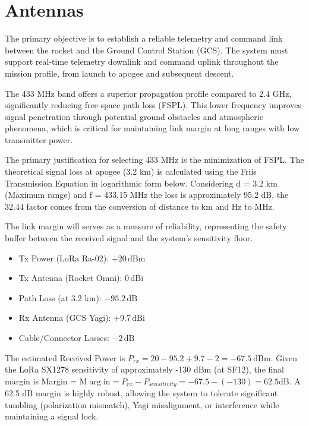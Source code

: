 \section{Antennas}

The primary objective is to establish a reliable telemetry and command link between the rocket and the Ground Control Station (GCS). The system must support real-time telemetry downlink and command uplink throughout the mission profile, from launch to apogee and subsequent descent.  

The 433 MHz band offers a superior propagation profile compared to 2.4 GHz, significantly reducing free-space path loss (FSPL). This lower frequency improves signal penetration through potential ground obstacles and atmospheric phenomena, which is critical for maintaining link margin at long ranges with low transmitter power. 

The primary justification for selecting 433 MHz is the minimization of FSPL. The theoretical signal loss at apogee (3.2 km) is calculated using the Friis Transmission Equation in logarithmic form below. Considering d = 3.2 km (Maximum range) and f = 433.15 MHz the loss is approximately 95.2 dB, the 32.44 factor comes from the conversion of distance to km and Hz to MHz. 

The link margin will serves as a measure of reliability, representing the safety buffer between the received signal and the system's sensitivity floor. 

\begin{itemize}
    \item Tx Power (LoRa Ra-02): \(+20 \,\text{dBm}\)
    \item Tx Antenna (Rocket Omni): \(0 \,\text{dBi}\)
    \item Path Loss (at 3.2 km): \(-95.2 \,\text{dB}\)
    \item Rx Antenna (GCS Yagi): \(+9.7 \,\text{dBi}\)
    \item Cable/Connector Losses: \(-2 \,\text{dB}\)
\end{itemize}

The estimated Received Power is $P_{rx}=20-95.2+9.7-2=-67.5\mathrm{\ dBm}$. Given the LoRa SX1278 sensitivity of approximately -130 dBm (at SF12), the final margin is 
Margin = $\mathrm{M\arg in}=P_{rx}-P_{sensitivity}=-67.5-\left(-130\right)=62.5\mathrm{dB}$. A 62.5 $\mathrm{dB}$ margin is highly robust, allowing the system to tolerate significant tumbling (polarization mismatch), Yagi misalignment, or interference while maintaining a signal lock. 

